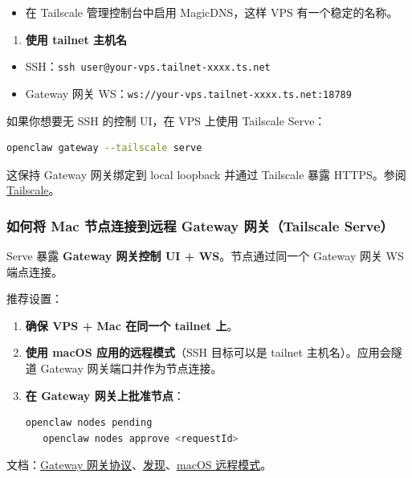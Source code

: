 \begin{itemize}
  \item 在 Tailscale 管理控制台中启用 MagicDNS，这样 VPS 有一个稳定的名称。
\end{itemize}

\begin{enumerate}
  \item \textbf{使用 tailnet 主机名}
\end{enumerate}

\begin{itemize}
  \item SSH：\texttt{ssh user@your-vps.tailnet-xxxx.ts.net}
  \item Gateway 网关 WS：\texttt{ws://your-vps.tailnet-xxxx.ts.net:18789}
\end{itemize}


如果你想要无 SSH 的控制 UI，在 VPS 上使用 Tailscale Serve：

\begin{lstlisting}[language=bash]
openclaw gateway --tailscale serve
\end{lstlisting}


这保持 Gateway 网关绑定到 local loopback 并通过 Tailscale 暴露 HTTPS。参阅 \href{/gateway/tailscale}{Tailscale}。

\subsubsection{如何将 Mac 节点连接到远程 Gateway 网关（Tailscale Serve）}


Serve 暴露 \textbf{Gateway 网关控制 UI + WS}。节点通过同一个 Gateway 网关 WS 端点连接。

推荐设置：

\begin{enumerate}
  \item \textbf{确保 VPS + Mac 在同一个 tailnet 上}。
  \item \textbf{使用 macOS 应用的远程模式}（SSH 目标可以是 tailnet 主机名）。应用会隧道 Gateway 网关端口并作为节点连接。
  \item \textbf{在 Gateway 网关上批准节点}：
\begin{lstlisting}[language=bash]
   openclaw nodes pending
   openclaw nodes approve <requestId>
\end{lstlisting}

\end{enumerate}


文档：\href{/gateway/protocol}{Gateway 网关协议}、\href{/gateway/discovery}{发现}、\href{/platforms/mac/remote}{macOS 远程模式}。

